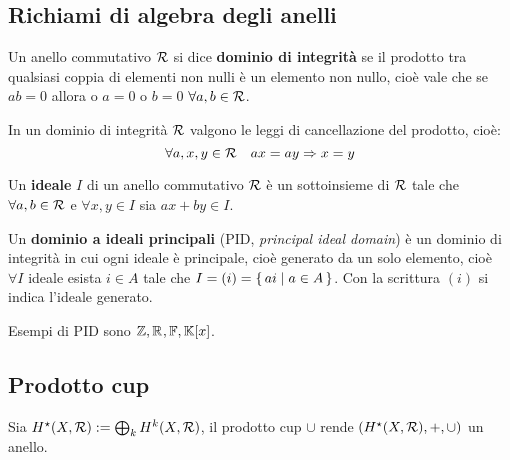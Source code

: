 \subsection{Richiami di algebra degli anelli}

\begin{definition}
  Un anello commutativo $ \mathcal{R} $ si dice \textbf{dominio di integrità}
  se il prodotto tra qualsiasi coppia di elementi non nulli è un elemento non nullo, cioè
  vale che se $ ab = 0 $ allora o $ a = 0 $ o $ b = 0 $ $ \forall a, b \in \mathcal{R} $.
\end{definition}

\begin{proposition}
  In un dominio di integrità $ \mathcal{R} $ valgono le leggi di cancellazione del prodotto, cioè:
  \[
    \forall a,x,y \in \mathcal{R} \quad ax = ay \Rightarrow x = y
  \]
\end{proposition}

\begin{definition}
  Un \textbf{ideale} $ I $ di un anello commutativo $ \mathcal{R} $ è un
  sottoinsieme di $ \mathcal{R} $ tale che $ \forall a,b \in \mathcal{R} $ e $ \forall x,y \in I $ sia
  $ a x + b y \in I $.
\end{definition}

\begin{definition}
  Un \textbf{dominio a ideali principali}
  (PID, \emph{principal ideal domain}) è un dominio di integrità in cui ogni
  ideale è principale, cioè generato da un solo
  elemento, cioè $ \forall I $ ideale esista $ i \in A $ tale che
  $ I = (i) = \set{a i | a \in A} $. Con la scrittura $ (i) $ si indica l'ideale
  generato.
\end{definition}

\begin{example}
  Esempi di PID sono $ \mathbb{Z}, \mathbb{R}^{}, \mathbb{F}, \mathbb{K}[x] $.
\end{example}

\subsection{Prodotto cup}

Sia $ H^\star (X,\mathcal{R}) := \bigoplus_k H^k(X,\mathcal{R}) $, il prodotto
cup $ \cup $ rende $ (H^\star (X,\mathcal{R}), +, \cup) $ un anello.

